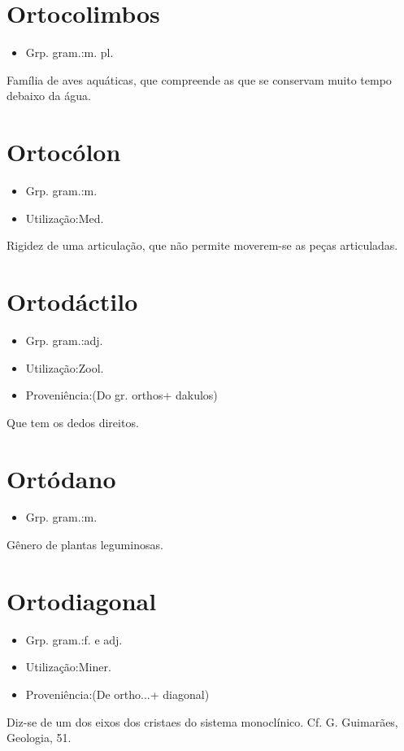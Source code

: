 \section{Ortocolimbos}
\begin{itemize}
\item {Grp. gram.:m. pl.}
\end{itemize}
Família de aves aquáticas, que compreende as que se conservam muito tempo debaixo da água.
\section{Ortocólon}
\begin{itemize}
\item {Grp. gram.:m.}
\end{itemize}
\begin{itemize}
\item {Utilização:Med.}
\end{itemize}
Rigidez de uma articulação, que não permite moverem-se as peças articuladas.
\section{Ortodáctilo}
\begin{itemize}
\item {Grp. gram.:adj.}
\end{itemize}
\begin{itemize}
\item {Utilização:Zool.}
\end{itemize}
\begin{itemize}
\item {Proveniência:(Do gr. \textunderscore orthos\textunderscore  + \textunderscore dakulos\textunderscore )}
\end{itemize}
Que tem os dedos direitos.
\section{Ortódano}
\begin{itemize}
\item {Grp. gram.:m.}
\end{itemize}
Gênero de plantas leguminosas.
\section{Ortodiagonal}
\begin{itemize}
\item {Grp. gram.:f.  e  adj.}
\end{itemize}
\begin{itemize}
\item {Utilização:Miner.}
\end{itemize}
\begin{itemize}
\item {Proveniência:(De \textunderscore ortho...\textunderscore  + \textunderscore diagonal\textunderscore )}
\end{itemize}
Diz-se de um dos eixos dos cristaes do sistema monoclínico. Cf. G. Guimarães, \textunderscore Geologia\textunderscore , 51.
